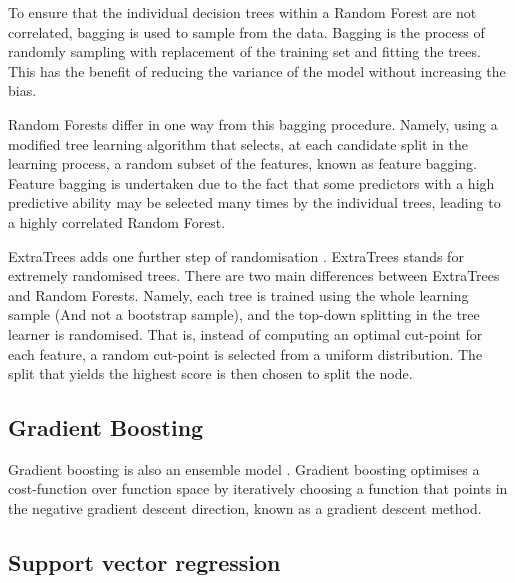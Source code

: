 To ensure that the individual decision trees within a Random Forest are not correlated, bagging is used to sample from the data. Bagging is the process of randomly sampling with replacement of the training set and fitting the trees. This has the benefit of reducing the variance of the model without increasing the bias. 

Random Forests differ in one way from this bagging procedure. Namely, using a modified tree learning algorithm that selects, at each candidate split in the learning process, a random subset of the features, known as feature bagging. Feature bagging is undertaken due to the fact that some predictors with a high predictive ability may be selected many times by the individual trees, leading to a highly correlated Random Forest.

ExtraTrees adds one further step of randomisation \cite{Fike1988}. ExtraTrees stands for extremely randomised trees. There are two main differences between ExtraTrees and Random Forests. Namely, each tree is trained using the whole learning sample (And not a bootstrap sample), and the top-down splitting in the tree learner is randomised. That is, instead of computing an optimal cut-point for each feature, a random cut-point is selected from a uniform distribution. The split that yields the highest score is then chosen to split the node. 


\subsection{Gradient Boosting}

Gradient boosting is also an ensemble model \cite{316}. Gradient boosting optimises a cost-function over function space by iteratively choosing a function that points in the negative gradient descent direction, known as a gradient descent method.

\subsection{Support vector regression}







